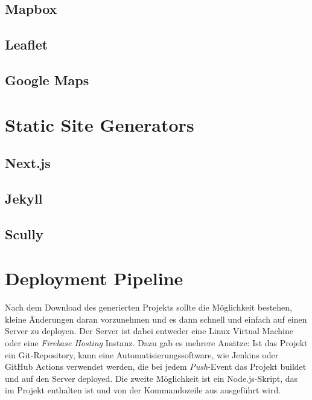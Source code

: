 \subsection{Mapbox}
\subsection{Leaflet}
\subsection{Google Maps}

\section{Static Site Generators}
\subsection{Next.js}
\subsection{Jekyll}
\subsection{Scully}

\section{Deployment Pipeline}
Nach dem Download des generierten Projekts sollte die Möglichkeit bestehen,
kleine Änderungen daran vorzunehmen und es dann schnell und einfach auf einen
Server zu deployen. Der Server ist dabei entweder eine Linux Virtual Machine
oder eine \textit{Firebase Hosting} Instanz.
Dazu gab es mehrere Ansätze: Ist das Projekt ein Git-Repository, kann eine
Automatisierungssoftware, wie Jenkins oder GitHub Actions verwendet werden,
die bei jedem \textit{Push}-Event das Projekt buildet und auf den Server
deployed. Die zweite Möglichkeit ist ein Node.js-Skript, das im Projekt
enthalten ist und von der Kommandozeile aus ausgeführt wird.
